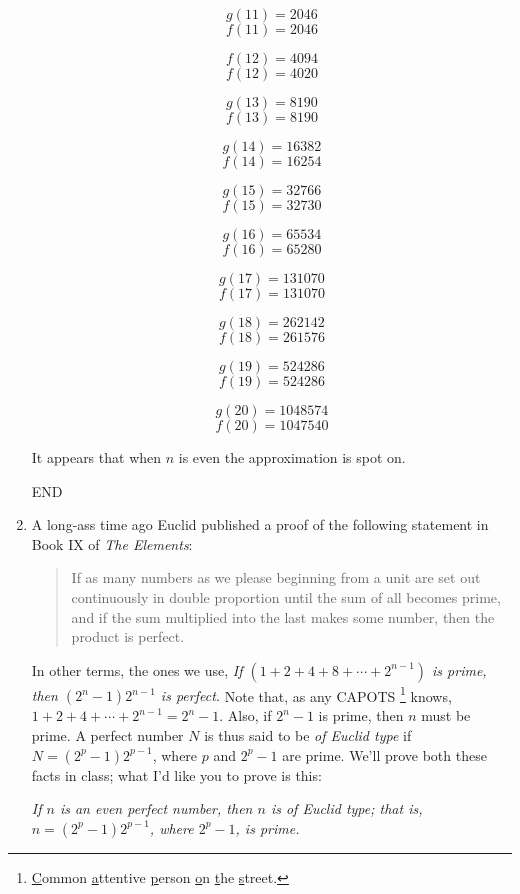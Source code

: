 \documentclass[10pt, AMS Euler]{article}
\begin{document}
\begin{enumerate}
            \newpage

            $$ g(11) = 2046 $$
            $$ f(11) = 2046 $$
            
            $$ f(12) = 4094 $$
            $$ f(12) = 4020 $$

            $$ g(13) = 8190 $$
            $$ f(13) = 8190 $$

            $$ g(14) = 16382 $$
            $$ f(14) = 16254 $$

            $$ g(15) = 32766 $$
            $$ f(15) = 32730 $$

            $$ g(16) = 65534 $$
            $$ f(16) = 65280 $$

            $$ g(17) = 131070 $$
            $$ f(17) = 131070 $$

            $$ g(18) = 262142 $$
            $$ f(18) = 261576 $$

            $$ g(19) = 524286 $$
            $$ f(19) = 524286 $$

            $$ g(20) = 1048574 $$
            $$ f(20) = 1047540 $$            

            It appears that when $n$ is even the approximation is spot on.

            END



  
		\newpage
		\item A long-ass time ago Euclid published a proof of the following statement in Book IX of \emph{The Elements}: 
		
		\begin{quotation}
			\noindent If as many numbers as we please beginning from a unit are set out continuously in double proportion until the sum of all becomes prime, and if the sum multiplied into the last makes some number, then the product is perfect. 
		\end{quotation}
		
		In other terms, the ones we use, \emph{If $(1+2+4+8+\cdots + 2^{n-1})$ is prime, then 
			$(2^n - 1)2^{n-1}$ is perfect.}  Note that, as any \textsc{CAPOTS} \footnote{\underline{C}ommon \underline{a}ttentive \underline{p}erson \underline{o}n \underline{t}he \underline{s}treet.} knows, $1+2+4 + \cdots + 2^{n-1} = 2^n -1$.
		Also, if $2^n -1$ is prime, then $n$ must be prime.
		A perfect number $N$ is thus said to be \emph{of Euclid type} if $N = (2^p-1)2^{p-1}$, where $p$ and $2^p -1$ are prime.  
		We'll prove both these facts in class; what I'd like you to prove is this:
		
		\emph{If $n$ is an even perfect number, then $n$ is of Euclid type; that is, $n = (2^p-1)2^{p-1}$, where $2^p -1$, is prime.}
		

\end{enumerate}
\end{document}
